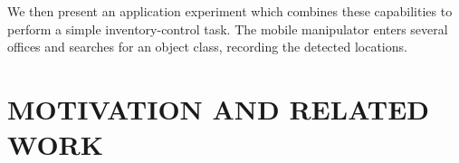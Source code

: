\documentclass[letterpaper, 10 pt, conference]{ieeeconf}  %
\begin{document}
We then present an application experiment which combines these capabilities to
perform a simple inventory-control task. The mobile manipulator enters several
offices and searches for an object class, recording the detected locations.



\section{MOTIVATION AND RELATED WORK}
\end{document}
